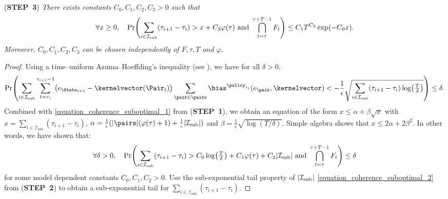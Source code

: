 \documentclass[preprint,cleveref,12pt]{colt2025}
\DeclarePairedDelimiter{\parens}{(}{)}	%
\DeclarePairedDelimiter{\abs}{\lvert}{\rvert}	%
\def\kernel{\kernelvector}
\def\STEP#1{(\strong{STEP~#1})}
\newcommand{\strong}[1]{\textbf{#1}}
\begin{document}
    \noindent
    \STEP{3}
    \textit{
        There exists constants $C_0, C_1, C_2, C_3 > 0$ such that
        \begin{equation}
            \forall x \ge 0,
            \quad
            \Pr \parens*{ 
                \sum_{i \in \mathcal{I}_\mathrm{sub}} (\tau_{i+1}-\tau_i)
                >
                x + C_3 \varphi(\tau)
                \text{~and~}
                \bigcap_{t=\tau}^{\tau+T-1} F_t
            }
            \le
            C_1 T^{C_2} \exp\parens*{- C_0 x}
            .
        \end{equation}
        Moreover, $C_0, C_1, C_2, C_3$ can be chosen independently of $F, \tau, T$ and $\varphi$. 
    }
    \medskip
    \begin{proof}
        Using a time--uniform Azuma--Hoeffding's inequality (see \cite[Lemma~5]{bourel_tightening_2020}), we have for all $\delta > 0$,
        \begin{equation}
            \nonumber
            \Pr \parens*{ 
                \sum_{i \in \mathcal{I}_\mathrm{sub}} 
                \sum_{t=\tau_i}^{\tau_{i+1}-1}
                \parens*{
                    e_{\State_{t+1}} - \kernel(\Pair_t)
                } \sum_{\pair \in \pairs} \bias^{\policy_{\tau_i}}(e_\pair, \kernel)
                <
                - \frac 1\epsilon \sqrt{
                    \sum_{i \in \mathcal{I}_\mathrm{sub}} 
                    (\tau_{i+1} - \tau_i)
                    \log\parens*{\tfrac T\delta}
                }
            }
            \le
            \delta
            .
        \end{equation}
        Combined with \eqref{equation_coherence_suboptimal_1} from \STEP{1}, we obtain an equation of the form $x \le \alpha + \beta \sqrt{x}$ with $x = \sum_{i \in \mathcal{I}_\mathrm{sub}} (\tau_{i+1} - \tau_i)$, $\alpha = \frac {1} \epsilon (\abs{\pairs} (\varphi(\tau) + 1) + \frac 1\epsilon \abs{\mathcal{I}_\mathrm{sub}})$ and $\beta = \frac 1\epsilon \sqrt{\log(T/\delta)}$. 
        Simple algebra shows that $x \le 2 \alpha + 2 \beta^2$. 
        In other words, we have shown that:
        \begin{equation}
            \nonumber
            \forall \delta > 0,
            \quad
            \Pr \parens*{ 
                \sum_{i \in \mathcal{I}_\mathrm{sub}} (\tau_{i+1}-\tau_i)
                >
                C_0 \log\parens*{\tfrac T\delta}
                + C_1 \varphi(\tau)
                + C_2 \abs{\mathcal{I}_\mathrm{sub}}
                \text{~and~}
                \bigcap_{t=\tau}^{\tau+T-1} F_t
            }
            \le
            \delta
        \end{equation}
        for some model dependent constants $C_0, C_1, C_2 > 0$. 
        Use the sub-exponential tail property of $\abs{\mathcal{I}_\mathrm{sub}}$ \eqref{equation_coherence_suboptimal_2} from \STEP{2} to obtain a sub-exponential tail for $\sum_{i \in \mathcal{I}_\mathrm{sub}} (\tau_{i+1} - \tau_i)$. 
    \end{proof}
\end{document}
